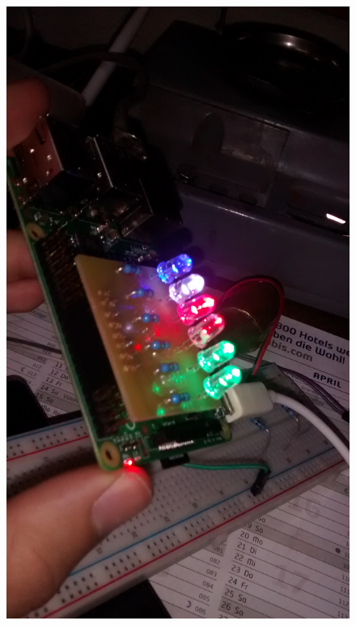 \begin{figure}[H]
\centering
\includegraphics[height=0.255\textheight]{Chapters/Chapter5/Figures/estructuraFinal/pcb6}

\end{figure}

